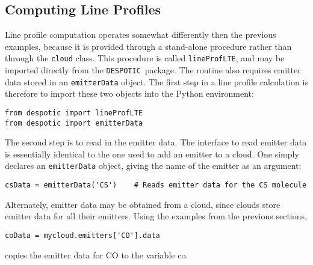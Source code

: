 \documentclass[12pt]{article}
\newcommand{\despotic}{\texttt{DESPOTIC}}
\begin{document}
\subsection{Computing Line Profiles}

Line profile computation operates somewhat differently then the previous examples, because it is provided through a stand-alone procedure rather than through the \verb=cloud= class. This procedure is called \verb=lineProfLTE=, and may be imported directly from the \despotic\ package. The routine also requires emitter data stored in an \verb=emitterData= object. The first step in a line profile calculation is therefore to import these two objects into the Python environment:
\begin{verbatim}
from despotic import lineProfLTE
from despotic import emitterData
\end{verbatim}

The second step is to read in the emitter data. The interface to read emitter data is essentially identical to the one used to add an emitter to a cloud. One simply declares an \verb=emitterData= object, giving the name of the emitter as an argument:
\begin{verbatim}
csData = emitterData('CS')    # Reads emitter data for the CS molecule
\end{verbatim}
Alternately, emitter data may be obtained from a cloud, since clouds store emitter data for all their emitters. Using the examples from the previous sections,
\begin{verbatim}
coData = mycloud.emitters['CO'].data
\end{verbatim}
copies the emitter data for CO to the variable co.
\end{document}
